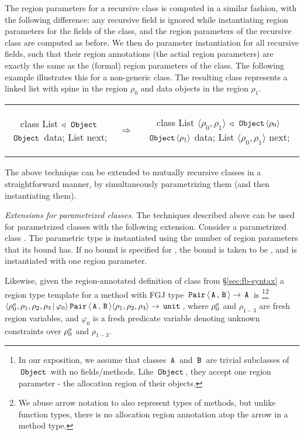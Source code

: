 The region parameters for a recursive class is computed in
a similar fashion, with the following difference: any recursive
field is ignored while instantiating region parameters for the fields of
the class, and the region parameters of the recursive class are computed
as before. We then do parameter instantiation for all recursive fields,
such that their region annotations (the actial region parameters) are
exactly the same as the (formal) region parameters of the class.
The following example illustrates this for a non-generic  class.
The resulting class represents a linked list with spine in the region
$\rho_0$ and data objects in the region $\rho_1$.

\begin{tabular}{ccc}
\begin{minipage}{0.28\linewidth}
\begin{codejava}
class List
  $\triangleleft$ $\,{\tt Object}\,$
{
  $\,{\tt Object}\,$ data;
  List next;
}
\end{codejava}
\end{minipage}
&
$\Rightarrow$
&
\begin{minipage}{0.5\linewidth}
\begin{codejava}
class List $\langle \rho_0, \rho_1 \rangle$
  $\triangleleft$ $\,{\tt Object}\, \langle \rho_0 \rangle$
{
  $\,{\tt Object}\, \langle \rho_1 \rangle$ data;
  List $\langle \rho_0, \rho_1 \rangle$ next;
}
\end{codejava}
\end{minipage}
\end{tabular}

The above technique can be extended to mutually recursive classes in a
straightforward manner, by simultaneously parametrizing them (and
then instantiating them).

\emph{Extensions for parametrized classes.}
The techniques described above can be used for parametrized classes
with the following extension. Consider a parametrized class .
The parametric type  is instantiated using the number of region parameters
that its bound  has. If no bound is specified for , the bound is taken
to be , and  is instantiated with one region parameter.


Likewise, given the region-annotated definition of
 class from \S\ref{sec:fb-syntax} a region type template for a
method with FGJ type $\,{\tt Pair}\,\langle \,{\tt A}\,,\,{\tt B}\, \rangle \rightarrow \,{\tt A}\,$
is \footnote{In our exposition, we assume that classes $\,{\tt A}\,$ and
$\,{\tt B}\,$ are trivial subclasses of $\,{\tt Object}\,$ with no fields/methods. Like
$\,{\tt Object}\,$, they accept one region parameter - the allocation region of
their objects.}\footnote{We abuse arrow notation to also represent
types of methods, but unlike function types, there is no allocation
region annotation atop the arrow in a method type.}
$\langle \rho^a_0,\rho_1,\rho_2,\rho_3 \,|\, \varphi_0 \rangle
\,{\tt Pair}\,\langle \,{\tt A}\,,\,{\tt B}\, \rangle \langle \rho_1,\rho_2,\rho_3 \rangle \rightarrow
\,{\tt unit}\,$, where $\rho^a_0$ and $\rho_{1-3}$ are fresh region
variables, and $\varphi_0$ is a fresh predicate variable denoting
unknown constraints over $\rho^a_0$ and $\rho_{1-3}$.


